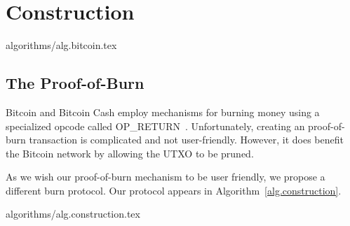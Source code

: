 \section{Construction}\label{section:construction}

{algorithms/alg.bitcoin.tex}


\subsection{The Proof-of-Burn}
Bitcoin and Bitcoin Cash employ mechanisms for burning money using a specialized
opcode called \textsf{OP\_RETURN}~\cite{bartoletti2017analysis}. Unfortunately,
creating an  proof-of-burn transaction is complicated and not
user-friendly. However, it does benefit the Bitcoin network by allowing the UTXO
to be pruned.

As we wish our proof-of-burn mechanism to be user friendly, we propose a
different burn protocol. Our protocol appears in
Algorithm~\ref{alg.construction}.

{algorithms/alg.construction.tex}